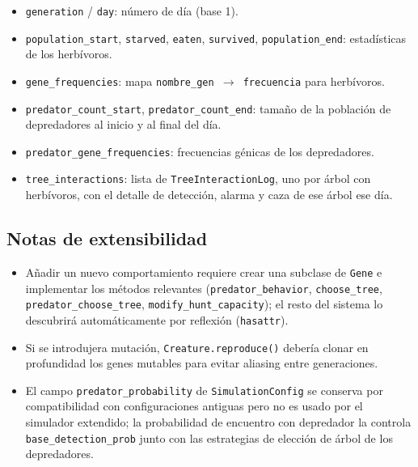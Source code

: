 \documentclass[11pt,a4paper]{article}
\begin{document}
\begin{itemize}
	\item \texttt{generation} / \texttt{day}: n\'umero de d\'ia (base 1).
	\item \texttt{population\_start}, \texttt{starved}, \texttt{eaten}, \texttt{survived},
	\texttt{population\_end}: estad\'isticas de los herb\'ivoros.
	\item \texttt{gene\_frequencies}: mapa \texttt{nombre\_gen $\to$ frecuencia} para herb\'ivoros.
	\item \texttt{predator\_count\_start}, \texttt{predator\_count\_end}: tama\~no de la poblaci\'on
	de depredadores al inicio y al final del d\'ia.
	\item \texttt{predator\_gene\_frequencies}: frecuencias g\'enicas de los depredadores.
	\item \texttt{tree\_interactions}: lista de \texttt{TreeInteractionLog}, uno por \'arbol con
	herb\'ivoros, con el detalle de detecci\'on, alarma y caza de ese \'arbol ese d\'ia.
\end{itemize}

\subsection{Notas de extensibilidad}

\begin{itemize}
	\item A\~nadir un nuevo comportamiento requiere crear una subclase de \texttt{Gene} e implementar
	los m\'etodos relevantes (\texttt{predator\_behavior}, \texttt{choose\_tree},
	\texttt{predator\_choose\_tree}, \texttt{modify\_hunt\_capacity}); el resto del sistema
	lo descubrir\'a autom\'aticamente por reflexi\'on (\texttt{hasattr}).
	\item Si se introdujera mutaci\'on, \texttt{Creature.reproduce()} deber\'ia clonar en
	profundidad los genes mutables para evitar aliasing entre generaciones.
	\item El campo \texttt{predator\_probability} de \texttt{SimulationConfig} se conserva
	por compatibilidad con configuraciones antiguas pero no es usado por el simulador extendido;
	la probabilidad de encuentro con depredador la controla \texttt{base\_detection\_prob} junto
	con las estrategias de elecci\'on de \'arbol de los depredadores.
\end{itemize}



\graphicspath{{figuras/}}
\end{document}
